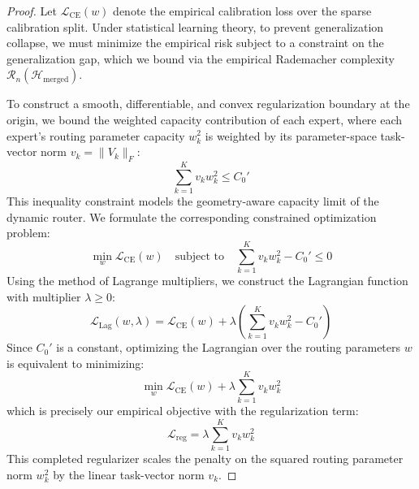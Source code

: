 \begin{proof}
Let $\mathcal{L}_{\text{CE}}(w)$ denote the empirical calibration loss over the sparse calibration split. Under statistical learning theory, to prevent generalization collapse, we must minimize the empirical risk subject to a constraint on the generalization gap, which we bound via the empirical Rademacher complexity $\mathcal{R}_n(\mathcal{H}_{\text{merged}})$.

To construct a smooth, differentiable, and convex regularization boundary at the origin, we bound the weighted capacity contribution of each expert, where each expert's routing parameter capacity $w_k^2$ is weighted by its parameter-space task-vector norm $v_k = \|V_k\|_F$:
\begin{equation}
    \sum_{k=1}^K v_k w_k^2 \le C_0'
\end{equation}
This inequality constraint models the geometry-aware capacity limit of the dynamic router. We formulate the corresponding constrained optimization problem:
\begin{equation}
    \min_{w} \mathcal{L}_{\text{CE}}(w) \quad \text{subject to} \quad \sum_{k=1}^K v_k w_k^2 - C_0' \le 0
\end{equation}
Using the method of Lagrange multipliers, we construct the Lagrangian function with multiplier $\lambda \ge 0$:
\begin{equation}
    \mathcal{L}_{\text{Lag}}(w, \lambda) = \mathcal{L}_{\text{CE}}(w) + \lambda \left( \sum_{k=1}^K v_k w_k^2 - C_0' \right)
\end{equation}
Since $C_0'$ is a constant, optimizing the Lagrangian over the routing parameters $w$ is equivalent to minimizing:
\begin{equation}
    \min_{w} \mathcal{L}_{\text{CE}}(w) + \lambda \sum_{k=1}^K v_k w_k^2
\end{equation}
which is precisely our empirical objective with the regularization term:
\begin{equation}
    \mathcal{L}_{\text{reg}} = \lambda \sum_{k=1}^K v_k w_k^2
\end{equation}
This completed regularizer scales the penalty on the squared routing parameter norm $w_k^2$ by the linear task-vector norm $v_k$.


\end{proof}
